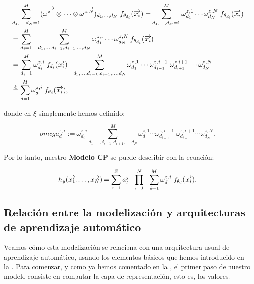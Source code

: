\begin{equation}
	\begin{split}
        &\sum_{d_1, \ldots, d_N = 1}^{M}  (\overrightarrow{\omega^{z, 1}} \otimes \cdots \otimes \overrightarrow{\omega^{z, N}})_{d_1, \ldots, d_N} \; f_{\theta_{d_i}}(\overrightarrow{x_i}) = \sum_{d_1, \ldots, d_N = 1}^{M} \omega^{z, 1}_{d_1} \cdots \omega^{z, N}_{d_N} \; f_{\theta_{d_i}}(\overrightarrow{x_i}) \\
		&= \sum_{d_i = 1}^M \ \  \sum_{d_1, \ldots, d_{i -1}, d_{i+1}, \ldots, d_N}^M \omega^{z, 1}_{d_1} \cdots \omega^{z, N}_{d_N} \; f_{\theta_{d_i}}(\overrightarrow{x_i}) \\
		&= \sum_{d_i = 1}^M \omega_{d_i}^{z, i} \; f_{d_i}(\overrightarrow{x_i}) \ \  \sum_{d_1, \ldots, d_{i -1}, d_{i+1}, \ldots, d_N}^M \omega^{z, 1}_{d_1} \cdots \omega^{z, i-1}_{d_{i-1}} \; \omega^{z, i+1}_{d_{i+1}} \cdots \omega^{z, N}_{d_N} \\
        &\stackrel{\xi}{=} \sum_{d = 1}^{M} \omega_d^{z,i}  \; f_{\theta_{d}}(\overrightarrow{x_i}),
	\end{split}
\end{equation}

donde en $\xi$ simplemente hemos definido:

\begin{equation}
    omega_d^{z, i} := \omega_{d_i}^{z, i} \sum_{d_1, \ldots, d_{i -1}, d_{i+1}, \ldots, d_N}^M \omega^{z, 1}_{d_1} \cdots \omega^{z, i-1}_{d_{i-1}} \; \omega^{z, i+1}_{d_{i+1}} \cdots \omega^{z, N}_{d_N}.
\end{equation}

Por lo tanto, nuestro \textbf{Modelo CP} se puede describir con la ecuación:

\begin{equation} \label{eq:cp_model}
	h_y(\overrightarrow{x_1}, \ldots, \overrightarrow{x_N}) =  \sum_{z = 1}^Z a_z^y \ \  \prod_{i = 1}^N \ \  \sum_{d = 1}^{M} \omega^{z, i}_d \; f_{\theta_{d}}(\overrightarrow{x_i}).
\end{equation}

\subsection{Relación entre la modelización y arquitecturas de aprendizaje automático}

Veamos cómo esta modelización se relaciona con una arquitectura usual de aprendizaje automático, usando los elementos básicos que hemos introducido en la . Para comenzar, y como ya hemos comentado en la , el primer paso de nuestro modelo consiste en computar la capa de representación, esto es, los valores:

